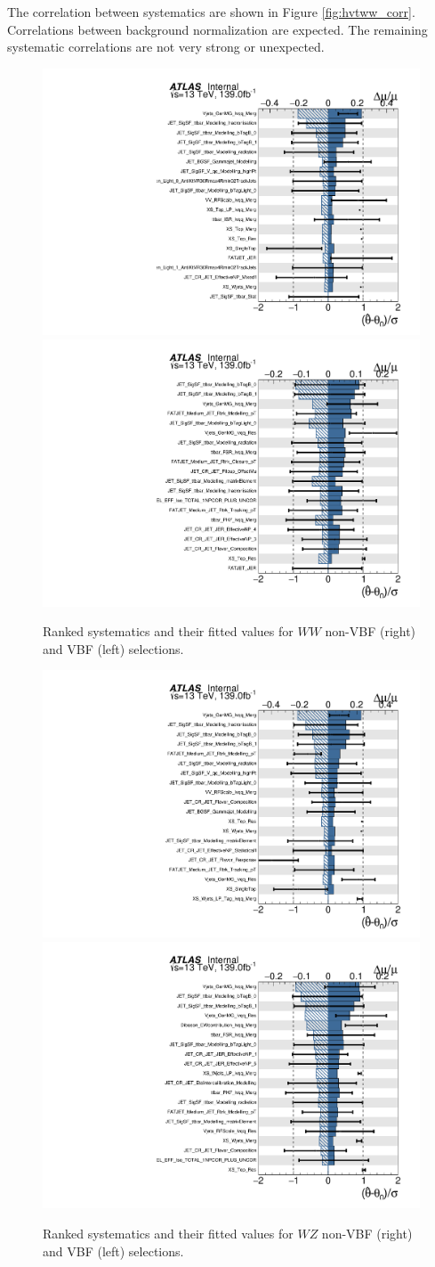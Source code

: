 The correlation between systematics are shown in Figure \ref{fig:hvtww_corr}. Correlations between background normalization are expected. The remaining systematic correlations are not very strong or unexpected.
\begin{figure}[h!]
  \centering
  \includegraphics[width=0.48\hsize]{figures/results/HVTWW/ranking_data/nov7_hvtww_2000gev/ranking.pdf}
    \includegraphics[width=0.48\hsize]{figures/results/HVTWWVBF/ranking_data/nov7_hvtwwvbf_1000gev/ranking.pdf}
 \caption{Ranked systematics and their fitted values for $WW$ non-VBF (right) and VBF (left) selections.} 
  \label{fig:hvtww_ranking}
\end{figure} 
\FloatBarrier

\begin{figure}[h!]
  \centering
  \includegraphics[width=0.48\hsize]{figures/results/HVTWZ/ranking_data/nov7_hvtwz_1000gev/ranking.pdf}
    \includegraphics[width=0.48\hsize]{figures/results/HVTWZVBF/ranking_data/nov7_hvtwzvbf_1000gev/ranking.pdf}
 \caption{Ranked systematics and their fitted values for $WZ$ non-VBF (right) and VBF (left) selections.} 
  \label{fig:hvtwz_ranking}
\end{figure} 
\FloatBarrier

